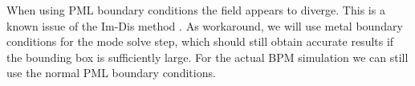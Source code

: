 \documentclass[]{article}
\begin{document}
	When using PML boundary conditions the field appears to diverge. This is a known issue of the Im-Dis method \cite{Shibayama_Yamazaki_Yamauchi_Nakano_2005}. As workaround, we will use metal boundary conditions for the mode solve step, which should still obtain accurate results if the bounding box is sufficiently large. For the actual BPM simulation we can still use the normal PML boundary conditions.
	
	

	
	
	
	
\end{document}
